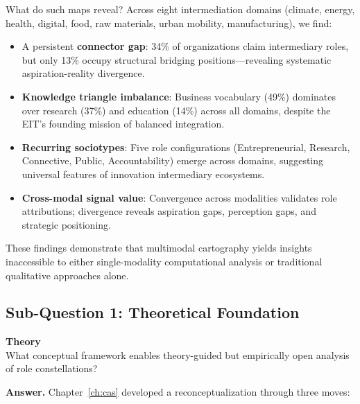 \documentclass[../main.tex]{subfiles}
\begin{document}
What do such maps reveal? Across eight intermediation domains (climate, energy, health, digital, food, raw materials, urban mobility, manufacturing), we find:

\begin{itemize}[leftmargin=*, itemsep=0.3em]
\item A persistent \textbf{connector gap}: 34\% of organizations claim intermediary roles, but only 13\% occupy structural bridging positions---revealing systematic aspiration-reality divergence.
\item \textbf{Knowledge triangle imbalance}: Business vocabulary (49\%) dominates over research (37\%) and education (14\%) across all domains, despite the EIT's founding mission of balanced integration.
\item \textbf{Recurring sociotypes}: Five role configurations (Entrepreneurial, Research, Connective, Public, Accountability) emerge across domains, suggesting universal features of innovation intermediary ecosystems.
\item \textbf{Cross-modal signal value}: Convergence across modalities validates role attributions; divergence reveals aspiration gaps, perception gaps, and strategic positioning.
\end{itemize}

These findings demonstrate that multimodal cartography yields insights inaccessible to either single-modality computational analysis or traditional qualitative approaches alone.

\subsection{Sub-Question 1: Theoretical Foundation}

\begin{subrq}
\textbf{Theory}\\
What conceptual framework enables theory-guided but empirically open analysis of role constellations?
\end{subrq}

\noindent\textbf{Answer.} Chapter~\ref{ch:cas} developed a reconceptualization through three moves:
\end{document}

